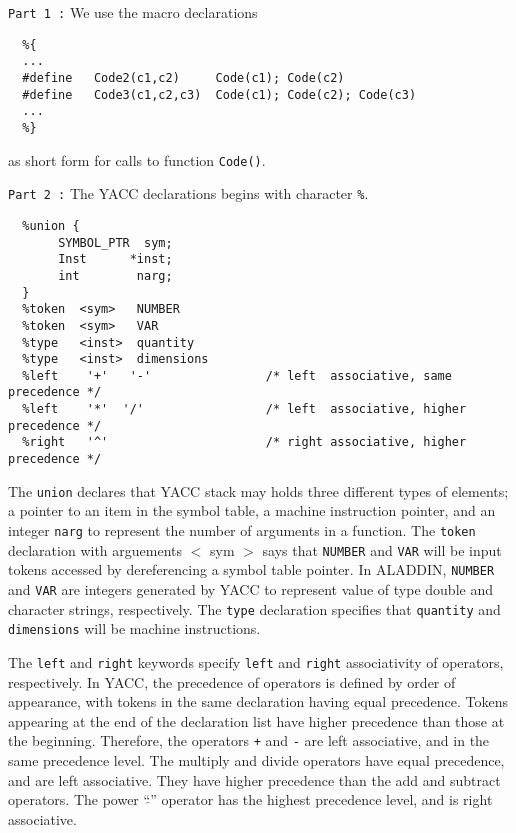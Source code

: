 \vspace{0.15 in}\noindent
{\tt Part 1 :} We use the macro declarations 

\begin{footnotesize}
\begin{verbatim}
  %{
  ... 
  #define   Code2(c1,c2)     Code(c1); Code(c2)
  #define   Code3(c1,c2,c3)  Code(c1); Code(c2); Code(c3)
  ...
  %}
\end{verbatim}
\end{footnotesize}

\vspace{0.05 in}\noindent
as short form for calls to function {\tt Code()}.

\vspace{0.15 in}\noindent
{\tt Part 2 :}
The YACC declarations begins with character {\tt \%}.

\begin{footnotesize}
\begin{verbatim}
  %union {
       SYMBOL_PTR  sym;
       Inst      *inst;
       int        narg;
  }
  %token  <sym>   NUMBER 
  %token  <sym>   VAR
  %type   <inst>  quantity 
  %type   <inst>  dimensions
  %left    '+'   '-'                /* left  associative, same   precedence */
  %left    '*'  '/'                 /* left  associative, higher precedence */ 
  %right   '^'                      /* right associative, higher precedence */  
\end{verbatim}
\end{footnotesize}

\vspace{0.05 in}\noindent
The {\tt union} declares that YACC stack may
holds three different types of elements;
a pointer to an item in the symbol table,
a machine instruction pointer, and an integer {\tt narg}
to represent the number of arguments in a function.
The {\tt token} declaration with arguements $<$ sym $>$ says
that {\tt NUMBER} and {\tt VAR} will be input tokens accessed
by dereferencing a symbol table pointer.
In ALADDIN, {\tt NUMBER} and {\tt VAR} are integers generated by YACC
to represent value of type double and character strings, respectively.
The {\tt type} declaration specifies that {\tt quantity}
and {\tt dimensions} will be machine instructions.

\vspace{0.15 in}
\noindent\hspace{0.5 in}
The {\tt left} and {\tt right} keywords specify
{\tt left} and {\tt right} associativity of operators, respectively.
In YACC, the precedence of operators is defined by order of appearance,
with tokens in the same declaration having equal precedence.
Tokens appearing at the end of the declaration list have higher precedence
than those at the beginning. Therefore, the operators {\tt +} and {\tt -}
are left associative, and in the same precedence level.
The multiply and divide operators have equal precedence, and are left associative.
They have higher precedence than the add and subtract operators.
The power ``$\hat{}$'' operator has the highest precedence level, and is right associative.


